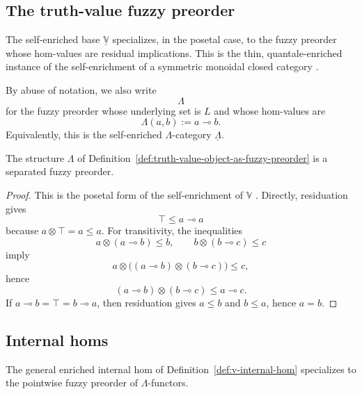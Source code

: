 \subsection{The truth-value fuzzy preorder}
\label{subsec:the-truth-value-object}

The self-enriched base \(\underline{\mathbb V}\) specializes, in the posetal case, to the fuzzy preorder whose hom-values are residual implications. This is the thin, quantale-enriched instance of the self-enrichment of a symmetric monoidal closed category \cite[Section~1.6, especially formula~(1.28)]{Kelly1982BasicConcepts}.

\begin{definition}
\label{def:truth-value-object-as-fuzzy-preorder}
    By abuse of notation, we also write
    \[
        \Lambda
    \]
    for the fuzzy preorder whose underlying set is \(L\) and whose
    hom-values are
    \[
        \Lambda(a,b):=a\multimap b.
    \]
    Equivalently, this is the self-enriched \(\Lambda\)-category \(\underline{\Lambda}\).
\end{definition}

\begin{proposition}
\label{prop:truth-value-object-is-fuzzy-preorder}
    The structure \(\Lambda\) of Definition~\ref{def:truth-value-object-as-fuzzy-preorder} is a separated fuzzy preorder.
\end{proposition}

\begin{proof}
    This is the posetal form of the self-enrichment of \(\mathbb V\) \cite[Section~1.6]{Kelly1982BasicConcepts}. Directly, residuation gives
    \[
        \top\leq a\multimap a
    \]
    because \(a\otimes \top=a\leq a\). For transitivity, the inequalities
    \[
        a\otimes(a\multimap b)\leq b,
        \qquad
        b\otimes(b\multimap c)\leq c
    \]
    imply
    \[
        a\otimes\bigl((a\multimap b)\otimes(b\multimap c)\bigr)\leq c,
    \]
    hence
    \[
        (a\multimap b)\otimes(b\multimap c)\leq a\multimap c.
    \]
    If \(a\multimap b=\top=b\multimap a\), then residuation gives \(a\leq b\) and \(b\leq a\), hence \(a=b\).
\end{proof}

\subsection{Internal homs}
\label{subsec:internal-homs}

The general enriched internal hom of Definition~\ref{def:v-internal-hom} specializes to the pointwise fuzzy preorder of \(\Lambda\)-functors.

